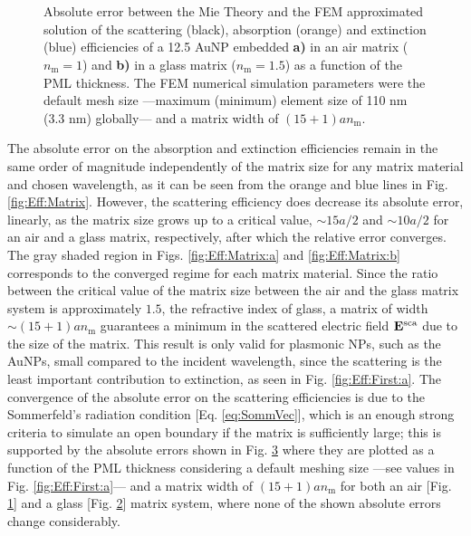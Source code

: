 %
\begin{figure}[b!]
	\centering
	\def\svgwidth{.9\textwidth}
	\small
	\hspace*{-.77\textwidth}
	 \begin{subfigure}{\textwidth}\caption{}\label{fig:Eff:PML:a}\end{subfigure}\\[7.35em]
	\hspace*{-.77\textwidth}
	      \begin{subfigure}{\textwidth}\caption{}\label{fig:Eff:PML:b}\end{subfigure}\\[-11.75em]
\caption[Scattering, Absorption and Extinction Efficiencies absolute error: PML thickness analysis ]{Absolute error between the Mie Theory and the FEM approximated solution of the scattering (black), absorption (orange) and extinction (blue) efficiencies of a 12.5 AuNP embedded \textbf{a)} in an air matrix ($n_\text{m} = 1$) and \textbf{b)} in a glass matrix ($n_\text{m} = 1.5$) as a  function of the PML thickness. The FEM numerical simulation parameters were the default mesh size ---maximum (minimum) element size of 110 nm (3.3 nm) globally--- and a matrix width of $(15+1) a n_\text{m}$.}
\label{fig:Eff:PML}
\end{figure}

The absolute error on the absorption and extinction efficiencies remain in the same order of magnitude independently of the matrix size for any matrix material and chosen wavelength, as it can be seen from the orange and blue lines in Fig. \ref{fig:Eff:Matrix}. However, the scattering efficiency does decrease its absolute error, linearly, as the matrix size grows  up to a critical value, $\sim 15 a/2$ and $\sim 10 a/2$ for an air and a glass matrix, respectively, after which the relative error converges. The gray shaded region in Figs. \ref{fig:Eff:Matrix:a}  and \ref{fig:Eff:Matrix:b} corresponds to the converged regime for each matrix material. Since the ratio between the critical value of the matrix size between the air  and the glass matrix system is approximately $1.5$, the refractive index of glass, a matrix of width $\sim (15+1) a n_\text{m}$ guarantees a minimum in the scattered electric field $\vb{E}^\text{sca}$ due to the size of the matrix. This result is only valid for plasmonic NPs, such as the AuNPs, small compared to the incident wavelength, since the scattering is the least important contribution to extinction, as seen in Fig. \ref{fig:Eff:First:a}. The convergence of the absolute error on the scattering efficiencies is due to the Sommerfeld's radiation condition [Eq. \eqref{eq:SommVec}], which is an enough strong criteria to simulate an open boundary if the matrix is sufficiently large; this is supported by the absolute errors shown in Fig. \ref{fig:Eff:PML} where they are plotted as a function of the PML thickness considering a default meshing size ---see values in Fig. \ref{fig:Eff:First:a}--- and a matrix width of  $(15+1) a n_\text{m}$ for both an air [Fig. \ref{fig:Eff:PML:a}] and a glass [Fig. \ref{fig:Eff:PML:b}] matrix system, where none of the shown absolute errors change considerably.

